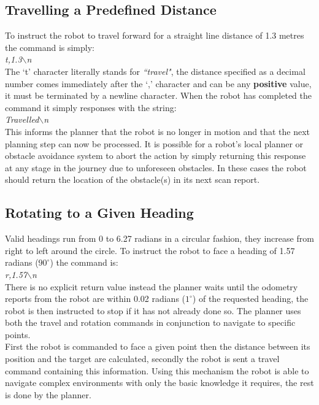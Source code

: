 \subsection{Travelling a Predefined Distance}
\noindent
To instruct the robot to travel forward for a straight line distance of 1.3 metres the command is simply: \\

\textit{t,1.3$\backslash$n} \\

\noindent
The `t' character literally stands for \textit{``travel"}, the distance specified as a decimal number comes immediately after the `,' character and can be any \textbf{positive} value, it must be terminated by a newline character. When the robot has completed the command it simply responses with the string: \\

\textit{Travelled$\backslash$n} \\

\noindent
This informs the planner that the robot is no longer in motion and that the next planning step can now be processed. It is possible for a robot's local planner or obstacle avoidance system to abort the action by simply returning this response at any stage in the journey due to unforeseen obstacles. In these cases the robot should return the location of the obstacle(s) in its next scan report.

\subsection{Rotating to a Given Heading}
\noindent
Valid headings run from 0 to 6.27 radians in a circular fashion, they increase from right to left around the circle. To instruct the robot to face a heading of 1.57 radians ($90^{\circ}$) the command is: \\

\textit{r,1.57$\backslash$n} \\

\noindent
There is no explicit return value instead the planner waits until the odometry reports from the robot are within 0.02 radians ($1^{\circ}$) of the requested heading, the robot is then instructed to stop if it has not already done so. The planner uses both the travel and rotation commands in conjunction to navigate to specific points. \\

\noindent
First the robot is commanded to face a given point then the distance between its position and the target are calculated, secondly the robot is sent a travel command containing this information. Using this mechanism the robot is able to navigate complex environments with only the basic knowledge it requires, the rest is done by the planner.

